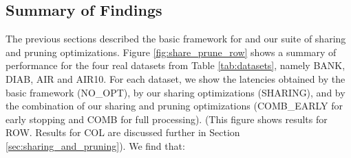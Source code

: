 \subsection{Summary of Findings}
\label{sec:expt_summary}

The previous sections described the basic framework for \SeeDB and our suite of sharing and pruning optimizations.
Figure \ref{fig:share_prune_row} shows a summary of \SeeDB performance for the four real datasets from Table \ref{tab:datasets}, namely BANK, DIAB, AIR and AIR10. 
For each dataset, we show the latencies obtained by the basic \SeeDB framework (NO\_OPT), by our sharing optimizations (SHARING), and by the combination of our sharing and pruning optimizations (COMB\_EARLY for early stopping and COMB for full processing).
(This figure shows results for ROW. Results for COL are discussed further in Section \ref{sec:sharing_and_pruning}).
We find that:


